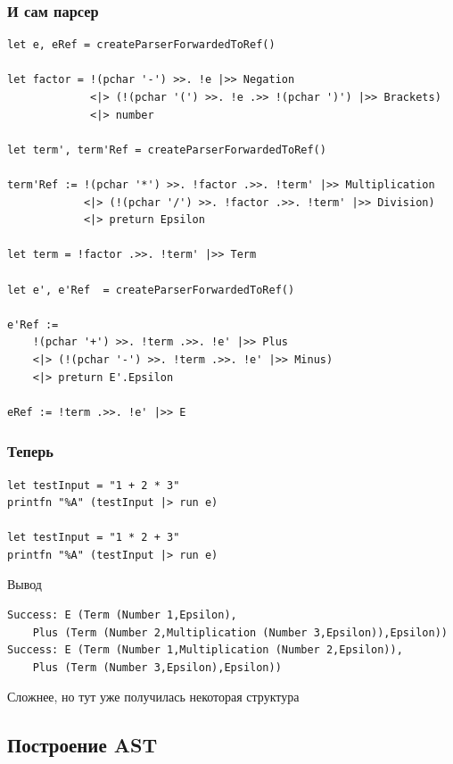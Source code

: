 \documentclass[xetex,mathserif,serif]{beamer}
\begin{document}
    \begin{frame}[fragile]
        \frametitle{И сам парсер}
        \begin{scriptsize}
            \begin{verbatim}
let e, eRef = createParserForwardedToRef()

let factor = !(pchar '-') >>. !e |>> Negation
             <|> (!(pchar '(') >>. !e .>> !(pchar ')') |>> Brackets)
             <|> number

let term', term'Ref = createParserForwardedToRef()

term'Ref := !(pchar '*') >>. !factor .>>. !term' |>> Multiplication
            <|> (!(pchar '/') >>. !factor .>>. !term' |>> Division)
            <|> preturn Epsilon

let term = !factor .>>. !term' |>> Term

let e', e'Ref  = createParserForwardedToRef()

e'Ref :=
    !(pchar '+') >>. !term .>>. !e' |>> Plus
    <|> (!(pchar '-') >>. !term .>>. !e' |>> Minus)
    <|> preturn E'.Epsilon

eRef := !term .>>. !e' |>> E
            \end{verbatim}
        \end{scriptsize}
    \end{frame}

    \begin{frame}[fragile]
        \frametitle{Теперь}
        \begin{verbatim}
let testInput = "1 + 2 * 3"
printfn "%A" (testInput |> run e)

let testInput = "1 * 2 + 3"
printfn "%A" (testInput |> run e)
        \end{verbatim}

        \begin{exampleblock}{Вывод}
            \begin{verbatim}
Success: E (Term (Number 1,Epsilon),
    Plus (Term (Number 2,Multiplication (Number 3,Epsilon)),Epsilon))
Success: E (Term (Number 1,Multiplication (Number 2,Epsilon)),
    Plus (Term (Number 3,Epsilon),Epsilon))
            \end{verbatim}
        \end{exampleblock}
        Сложнее, но тут уже получилась некоторая структура
    \end{frame}

    \subsection{Построение AST}
\end{document}
